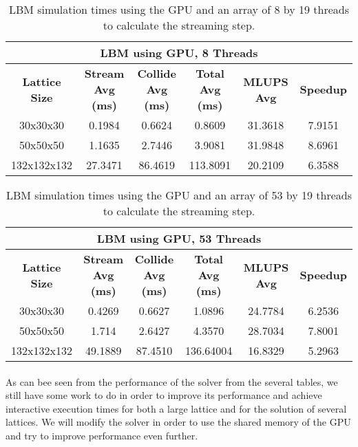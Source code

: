 \begin{table}[htbp]
  \centering
    \begin{tabular}{|c|c|c|c|c|c|}
    \toprule
    \multicolumn{6}{c}{\textbf{LBM using GPU, 8 Threads}} \\
    \midrule
    \textbf{Lattice Size	} & \textbf{Stream Avg (ms)} &	\textbf{ Collide Avg (ms)} & \textbf{Total Avg (ms)} & \textbf{MLUPS Avg} &\textbf{Speedup}\\
    30x30x30	&0.1984&0.6624&0.8609&31.3618&	7.9151\\
	50x50x50&	1.1635&	2.7446&	3.9081&31.9848&8.6961\\
	132x132x132	&27.3471&86.4619&	113.8091&20.2109&6.3588\\
    \bottomrule
    \end{tabular}%
	\caption{LBM simulation times using the GPU and an array of 8 by 19 threads to calculate the streaming step.}
	\label{tab:lbm_gpu_8}%
\end{table}%

\begin{table}[htbp]
  \centering
    \begin{tabular}{|c|c|c|c|c|c|}
    \toprule
    \multicolumn{6}{c}{\textbf{LBM using GPU, 53 Threads}} \\
    \midrule
    \textbf{Lattice Size	} & \textbf{Stream Avg (ms)} &	\textbf{ Collide Avg (ms)} & \textbf{Total Avg (ms)} & \textbf{MLUPS Avg} &\textbf{Speedup}\\
    30x30x30&	0.4269	&0.6627&1.0896&24.7784&6.2536\\
50x50x50&	1.714 	&2.6427 	&4.3570	&28.7034 &	7.8001\\
132x132x132	&49.1889 	&87.4510 	&136.64004 	&16.8329&	5.2963\\

    \bottomrule
    \end{tabular}%
       \caption{LBM simulation times using the GPU and an array of 53 by 19 threads to calculate the streaming step.}
  \label{tab:lbm_gpu_53}%
\end{table}%

\paragraph{}As can bee seen from the performance of the solver from the several tables, we still have some work to do in order to improve its performance and achieve interactive execution times for both a large lattice and for the solution of several lattices. We will modify the solver in order to use the shared memory of the GPU and try to improve performance even further. 

